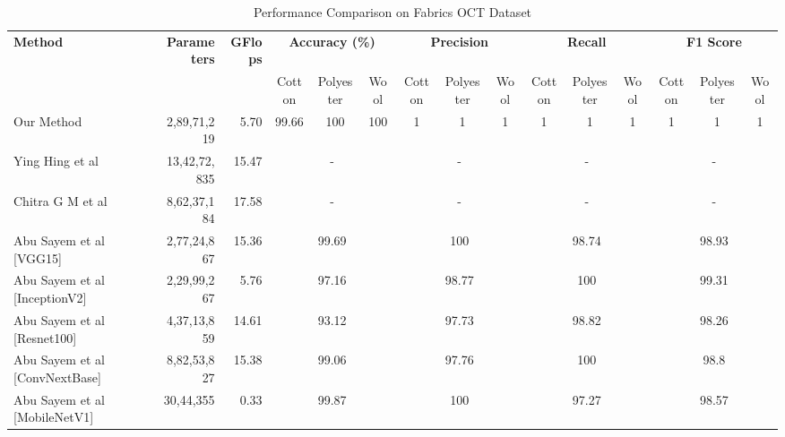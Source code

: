 \begin{table}[htbp]
\centering
\caption{Performance Comparison on Fabrics OCT Dataset}
\label{tab:oct_results}
\begin{adjustbox}{width=\textwidth}
\begin{tabular}{||l||r||r||ccc||ccc||ccc||ccc||}
\hline\hline
\multirow{2}{*}{\textbf{Method}} & \textbf{Parameters} & \textbf{GFlops} & \multicolumn{3}{c||}{\textbf{Accuracy (\%)}} & \multicolumn{3}{c||}{\textbf{Precision}} & \multicolumn{3}{c||}{\textbf{Recall}} & \multicolumn{3}{c||}{\textbf{F1 Score}} \\
\cline{4-15}
 & & & Cotton & Polyester & Wool & Cotton & Polyester & Wool & Cotton & Polyester & Wool & Cotton & Polyester & Wool \\
\hline\hline
Our Method & 2,89,71,219 & 5.70 & 99.66 & 100 & 100 & 1 & 1 & 1 & 1 & 1 & 1 & 1 & 1 & 1 \\
\hline
Ying Hing et al~\cite{hong2024research} & 13,42,72,835 & 15.47 & \multicolumn{3}{|c||}{-} & \multicolumn{3}{|c||}{-} & \multicolumn{3}{|c||}{-} & \multicolumn{3}{|c||}{-} \\
\hline
Chitra G M et al~\cite{chitra2023fabric} & 8,62,37,184 & 17.58 & \multicolumn{3}{|c||}{-} & \multicolumn{3}{|c||}{-} & \multicolumn{3}{|c||}{-} & \multicolumn{3}{|c||}{-} \\
\hline
Abu Sayem et al [VGG15]~\cite{siam2023textilenet} & 2,77,24,867 & 15.36 & \multicolumn{3}{|c||}{99.69} & \multicolumn{3}{|c||}{100} & \multicolumn{3}{|c||}{98.74} & \multicolumn{3}{|c||}{98.93} \\
\hline
Abu Sayem et al [InceptionV2]~\cite{siam2023textilenet} & 2,29,99,267 & 5.76 & \multicolumn{3}{|c||}{97.16} & \multicolumn{3}{|c||}{98.77} & \multicolumn{3}{|c||}{100} & \multicolumn{3}{|c||}{99.31} \\
\hline
Abu Sayem et al [Resnet100]~\cite{siam2023textilenet} & 4,37,13,859 & 14.61 & \multicolumn{3}{|c||}{93.12} & \multicolumn{3}{|c||}{97.73} & \multicolumn{3}{|c||}{98.82} & \multicolumn{3}{|c||}{98.26} \\
\hline
Abu Sayem et al [ConvNextBase]~\cite{siam2023textilenet} & 8,82,53,827 & 15.38 & \multicolumn{3}{|c||}{99.06} & \multicolumn{3}{|c||}{97.76} & \multicolumn{3}{|c||}{100} & \multicolumn{3}{|c||}{98.8} \\
\hline
Abu Sayem et al [MobileNetV1]~\cite{siam2023textilenet} & 30,44,355 & 0.33 & \multicolumn{3}{|c||}{99.87} & \multicolumn{3}{|c||}{100} & \multicolumn{3}{|c||}{97.27} & \multicolumn{3}{|c||}{98.57} \\
\hline\hline
\end{tabular}
\end{adjustbox}
\end{table}